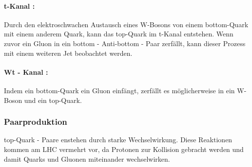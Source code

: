 \documentclass[
a4paper,                                %
twoside,                                %
BCOR1.4cm,                      %
ngerman,                                %
10pt,                           %
headings=normal,                %
headsepline,                    %
clearplainpage, %
final,                                  %
div=14,
parskip=full
]{scrbook}
\begin{document}
\paragraph{t-Kanal :}

Durch den elektroschwachen Austausch eines W-Bosons von einem bottom-Quark mit einem anderem Quark, kann das top-Quark im t-Kanal entstehen. Wenn zuvor ein Gluon in ein bottom - Anti-bottom - Paar zerf\"allt, kann dieser Prozess mit einem weiteren Jet beobachtet werden.

\paragraph{Wt - Kanal :}

Indem ein bottom-Quark ein Gluon einf\"angt, zerf\"allt es m\"oglicherweise in ein W-Boson und ein top-Quark.

\subsubsection{Paarproduktion}

top-Quark - Paare enstehen durch starke Wechselwirkung. Diese Reaktionen kommen am LHC vermehrt vor, da Protonen zur Kollision gebracht werden und damit Quarks und Gluonen miteinander wechselwirken.
\end{document}

